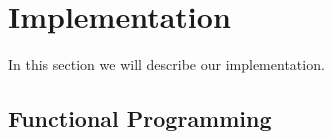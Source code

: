 \chapter{Implementation}
\label{chap:implementation}

In this section we will describe our implementation.

\section{Functional Programming}

